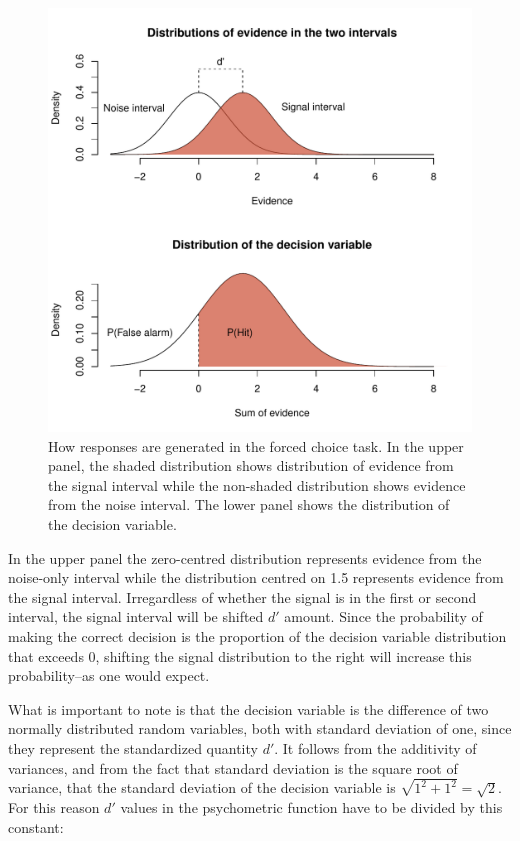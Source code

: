 \documentclass{article}\usepackage{knitr}
\begin{document}
\begin{figure}[!htb]
\centering
\begin{knitrout}
\color{fgcolor}
\includegraphics[width=\maxwidth]{figure/unnamed-chunk-7-1} 
\end{knitrout}
\caption{How responses are generated in the forced choice task. In the upper panel, the shaded distribution shows distribution of evidence from the signal interval while the non-shaded distribution shows evidence from the noise interval. The lower panel shows the distribution of the decision variable. }
\label{fig:2AFC}
\end{figure}

In the upper panel the zero-centred distribution represents evidence from the noise-only interval while the distribution centred on 1.5 represents evidence from the signal interval. Irregardless of whether the signal is in the first or second interval, the signal interval will be shifted $d'$ amount. Since the probability of making the correct decision is the proportion of the decision variable distribution that exceeds 0, shifting the signal distribution to the right will increase this probability--as one would expect.

What is important to note is that the decision variable is the difference of two normally distributed random variables, both with standard  deviation of one, since they represent the standardized quantity $d'$. It follows from the additivity of variances, and from the fact that standard deviation is the square root of variance, that the standard deviation of the decision variable is $\sqrt{1^2 + 1^2} = \sqrt{2}$. For this reason $d'$ values in the psychometric function have to be divided by this constant:
\end{document}
